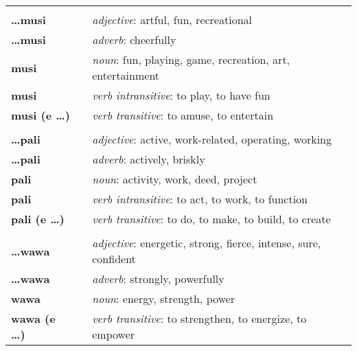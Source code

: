 \begin{supertabular}{p{2,5cm}|ll}
                            &  &                                                                              \\
    \textbf{\dots musi}     &  & \textit{adjective}: artful, fun, recreational                                \\
    \textbf{\dots musi}     &  & \textit{adverb}: cheerfully                                                  \\
    \textbf{musi}           &  & \textit{noun}: fun, playing, game, recreation, art, entertainment            \\
    \textbf{musi}           &  & \textit{verb intransitive}: to play, to have fun                             \\
    \textbf{musi (e \dots)} &  & \textit{verb transitive}: to amuse, to entertain                             \\
                            &  &                                                                              \\
    \textbf{\dots pali}     &  & \textit{adjective}: active, work-related, operating, working                 \\
    \textbf{\dots pali}     &  & \textit{adverb}: actively, briskly                                           \\
    \textbf{pali}           &  & \textit{noun}: activity, work, deed, project                                 \\
    \textbf{pali}           &  & \textit{verb intransitive}: to act, to work, to function                     \\
    \textbf{pali (e \dots)} &  & \textit{verb transitive}: to do, to make, to build, to create                \\
                            &  &                                                                              \\
    \textbf{\dots wawa}     &  & \textit{adjective}: energetic, strong, fierce, intense, sure, confident      \\
    \textbf{\dots wawa}     &  & \textit{adverb}: strongly, powerfully                                        \\
    \textbf{wawa}           &  & \textit{noun}: energy, strength, power                                       \\
    \textbf{wawa (e \dots)} &  & \textit{verb transitive}: to strengthen, to energize, to empower             \\
\end{supertabular}

